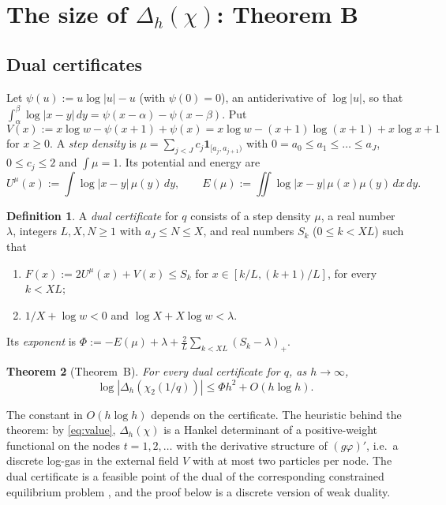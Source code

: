 \documentclass[11pt]{amsart}
\newtheorem{theorem}{Theorem}[section]
\theoremstyle{definition}
\newtheorem{definition}[theorem]{Definition}
\theoremstyle{remark}
\numberwithin{equation}{section}
\begin{document}
\section{The size of \texorpdfstring{$\Delta_h(\chi)$}{Delta_h(chi)}: Theorem B}\label{sec:analytic}

\subsection{Dual certificates}
Let $\psi(u):=u\log|u|-u$ (with $\psi(0)=0$), an antiderivative of $\log|u|$, so that
$\int_\alpha^\beta\log|x-y|\,dy=\psi(x-\alpha)-\psi(x-\beta)$. Put
\[
  V(x):=x\log w-\psi(x+1)+\psi(x)=x\log w-(x+1)\log(x+1)+x\log x+1
\]
for $x\ge0$.
A \emph{step density} is $\mu=\sum_{j<J}c_j\mathbf 1_{[a_j,a_{j+1})}$ with $0=a_0\le a_1\le\dots\le a_J$, $0\le c_j\le2$ and
$\int\mu=1$. Its potential and energy are
\[
  U^\mu(x):=\int\log|x-y|\,\mu(y)\,dy,\qquad E(\mu):=\iint\log|x-y|\,\mu(x)\mu(y)\,dx\,dy .
\]

\begin{definition}\label{def:cert}
A \emph{dual certificate} for $q$ consists of a step density $\mu$, a real number $\lambda$, integers $L,X,N\ge1$ with
$a_J\le N\le X$, and real numbers $S_k$ ($0\le k<XL$) such that
\begin{enumerate}
\item $F(x):=2U^\mu(x)+V(x)\le S_k$ for $x\in[k/L,(k+1)/L]$, for every $k<XL$;
\item $1/X+\log w<0$ and $\log X+X\log w<\lambda$.
\end{enumerate}
Its \emph{exponent} is $\Phi:=-E(\mu)+\lambda+\frac2L\sum_{k<XL}(S_k-\lambda)_+$.
\end{definition}

\begin{theorem}[Theorem~B]\label{thm:B}
For every dual certificate for $q$, as $h\to\infty$,
\[
  \log|\Delta_h(\chi_2(1/q))|\le\Phi h^2+O(h\log h).
\]
\end{theorem}

The constant in $O(h\log h)$ depends on the certificate. The heuristic behind the theorem: by \eqref{eq:value},
$\Delta_h(\chi)$ is a Hankel determinant of a positive-weight functional on the nodes $t=1,2,\dots$ with the
derivative structure of $(g\varphi)'$, i.e.\ a discrete log-gas in the external field $V$ with at most two
particles per node. The dual certificate is a feasible point of the dual of the corresponding constrained
equilibrium problem \cite[Ch.~I]{SaffTotik}, and the proof below is a discrete version of weak duality.
\end{document}

